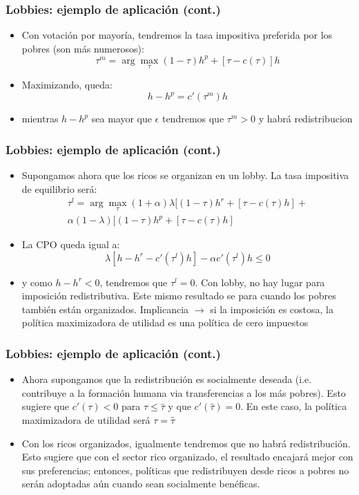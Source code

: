 \documentclass[14pt,aspectratio=169]{beamer}
\begin{document}
\begin{frame}
\frametitle{Lobbies: ejemplo de aplicación (cont.)}
\begin{itemize}
\item Con votación por mayoría, tendremos la tasa impositiva preferida por los pobres (son más numerosos):
\begin{equation}
\tau^m= \arg\max_{\tau} (1-\tau)h^p+[\tau-c(\tau)]h
\end{equation}
\item Maximizando, queda:
\begin{equation}
h-h^p=c'(\tau^m)h
\end{equation}
\item mientras $h-h^p$ sea mayor que $\epsilon$ tendremos que $\tau^m>0$ y habrá redistribucion
\end{itemize}
\end{frame}


\begin{frame}
\frametitle{Lobbies: ejemplo de aplicación (cont.)}
\begin{itemize}
\item Supongamos ahora que los ricos se organizan en un lobby. La tasa impositiva de equilibrio será:
\begin{align}
\tau^l= \arg\max_{\tau}  (1+\alpha)\lambda[(1-\tau)h^r+[\tau-c(\tau)h]+ \\ 
\alpha(1-\lambda)[(1-\tau)h^p+[\tau-c(\tau)h]  
\end{align}
\item La CPO queda igual a:
\begin{equation}
\lambda[h-h^r-c'(\tau^l)h]-\alpha c'(\tau^l)h \leq 0
\end{equation}
\item y como $h-h^r<0$, tendremos que $\tau^l=0$. Con lobby, no hay lugar para imposición redistributiva. Este mismo resultado se para cuando los pobres también están organizados. Implicancia $\longrightarrow$ si la imposición es costosa, la política maximizadora de utilidad es una política de cero impuestos
\end{itemize}
\end{frame}


\begin{frame}
\frametitle{Lobbies: ejemplo de aplicación (cont.)}
\begin{itemize}
\itemsep 15pt
\item Ahora supongamos que la redistribución es socialmente deseada (i.e. contribuye a la formación humana via transferencias a los más pobres). Esto sugiere que $c'(\tau)<0$ para $\tau \leq \hat{\tau}$ y que $c'(\hat{\tau})=0$. En este caso, la política maximizadora  de utilidad será $\tau=\hat{\tau}$
\item Con los ricos organizados, igualmente tendremos que no habrá redistribución. Esto sugiere que con el sector rico organizado, el resultado encajará mejor con sus preferencias; entonces, políticas que redistribuyen desde ricos a pobres no serán adoptadas aún cuando sean socialmente benéficas. 
\end{itemize}
\end{frame}
\end{document}

